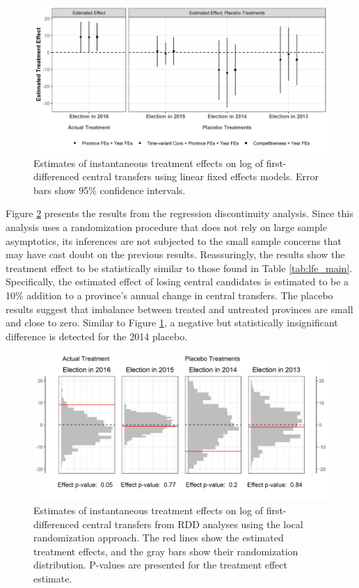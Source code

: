 \documentclass[12pt]{article}
\newcommand{\1}{\mathbbm{1}}
\begin{document}
\begin{figure}[!htbp]
	\centering
	\includegraphics[width=\textwidth]{figure/200916_lfe_placebo.png}
	\captionsetup{singlelinecheck=off}
	\caption[Estimated placebo linear fixed effects treatment effects]{Estimates of instantaneous treatment effects on log of first-differenced central transfers using linear fixed effects models. Error bars show 95\% confidence intervals.}
	\label{fig:lfe_placebo}
\end{figure}

Figure \ref{fig:rdd_placebo} presents the results from the regression discontinuity analysis. Since this analysis uses a randomization procedure that does not rely on large sample asymptotics, its inferences are not subjected to the small sample concerns that may have cast doubt on the previous results. Reassuringly, the results show the treatment effect to be statistically similar to those found in Table \ref{tab:lfe_main}. Specifically, the estimated effect of losing central candidates is estimated to be a 10\% addition to a province's annual change in central transfers. The placebo results suggest that imbalance between treated and untreated provinces are small and close to zero. Similar to Figure \ref{fig:lfe_placebo}, a negative but statistically insignificant difference is detected for the 2014 placebo. 

\begin{figure}[!htbp]
	\centering
	\includegraphics[width=\textwidth]{figure/200916_rdd_results.png}
	\captionsetup{singlelinecheck=off}
	\caption[Estimated RDD treatment effects]{Estimates of instantaneous treatment effects on log of first-differenced central transfers from RDD analyses using the local randomization approach. The red lines show the estimated treatment effects, and the gray bars show their randomization distribution. P-values are presented for the treatment effect estimate.}
	\label{fig:rdd_placebo}
\end{figure}
\end{document}
